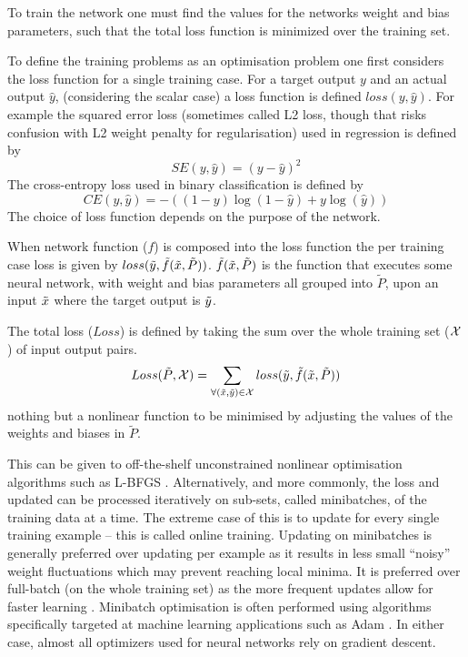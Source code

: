 \documentclass[12pt,parskip]{komatufte}
\begin{document}
To train the network one must find the values for the networks weight and bias parameters, such that the total loss function is minimized over the training set.

To define the training problems as an optimisation problem one first considers the loss function for a single training case.
For a target output $y$ and an actual output $\hat{y}$, (considering the scalar case) a loss function is defined $loss(y, \hat{y})$.
For example the squared error loss (sometimes called L2 loss, though that risks confusion with L2 weight penalty for regularisation) used in regression is defined by
\begin{equation}
SE(y, \hat{y})=(y-\hat{y})^2
\end{equation}
The cross-entropy loss used in binary classification is defined by
\begin{equation}
	CE(y, \hat{y})=-\left((1-y)\log (1-\hat{y}) + y\log (\hat{y})\right)
\end{equation}
The choice of loss function depends on the purpose of the network.

When network function ($f$) is composed into the loss function
the per training case loss is given by $loss(\tilde{y}, \tilde{f}(\tilde{x},\tilde{P}))$.
$\tilde{f}(\tilde{x},\tilde{P})$ is the function that executes some neural network, with weight and bias parameters all grouped into $\tilde{P}$, upon an input $\tilde{x}$ where the target output is $\tilde{y}$.

The total loss ($Loss$) is defined by taking the sum over the whole training set ($\mathcal{X}$) of input output pairs.
\begin{equation}
Loss(\tilde{P}, \mathcal{X}) = \sum_{\forall (\tilde{x}, \tilde{y})\in\mathcal{X}} loss(\tilde{y}, \tilde{f}(\tilde{x},\tilde{P}))
\label{equ:totalloss}
\end{equation}
 nothing but a nonlinear function to be minimised by adjusting the values of the weights and biases in $\tilde{P}$.

This can be given to off-the-shelf  unconstrained nonlinear optimisation algorithms  such as L-BFGS  \parencite{nocedal1980updating}.
Alternatively, and more commonly, the loss and updated can be processed iteratively on sub-sets, called minibatches, of the training data at a time.
The extreme case of this is to update for every single training example -- this is called online training.
Updating on minibatches is generally preferred over updating per example as it results in less small ``noisy'' weight fluctuations which may prevent reaching local minima.
It is preferred over full-batch (on the whole training set) as the more frequent updates allow for faster learning .
Minibatch optimisation is often performed using algorithms specifically targeted at machine learning applications such as Adam \parencite{kingma2014adam}.
In either case, almost all optimizers used for neural networks rely on gradient descent.
\end{document}
